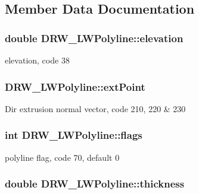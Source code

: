 \subsection{Member Data Documentation}
\hypertarget{classDRW__LWPolyline_a86ba4b8badb8f008997401ec9f084a3b}{
\subsubsection[{elevation}]{\setlength{\rightskip}{0pt plus 5cm}double D\-R\-W\-\_\-\-L\-W\-Polyline\-::elevation}}\label{classDRW__LWPolyline_a86ba4b8badb8f008997401ec9f084a3b}
elevation, code 38 \hypertarget{classDRW__LWPolyline_a859105f0a27e812dc074483809a38194}{
\subsubsection[{ext\-Point}]{ D\-R\-W\-\_\-\-L\-W\-Polyline\-::ext\-Point}}\label{classDRW__LWPolyline_a859105f0a27e812dc074483809a38194}
Dir extrusion normal vector, code 210, 220 \& 230 \hypertarget{classDRW__LWPolyline_a66f6b406675a3c4ef540099356973510}{
\subsubsection[{flags}]{\setlength{\rightskip}{0pt plus 5cm}int D\-R\-W\-\_\-\-L\-W\-Polyline\-::flags}}\label{classDRW__LWPolyline_a66f6b406675a3c4ef540099356973510}
polyline flag, code 70, default 0 \hypertarget{classDRW__LWPolyline_abab38cc3e874a5c89469b382ebeb2284}{
\subsubsection[{thickness}]{\setlength{\rightskip}{0pt plus 5cm}double D\-R\-W\-\_\-\-L\-W\-Polyline\-::thickness}}\label{classDRW__LWPolyline_abab38cc3e874a5c89469b382ebeb2284}
